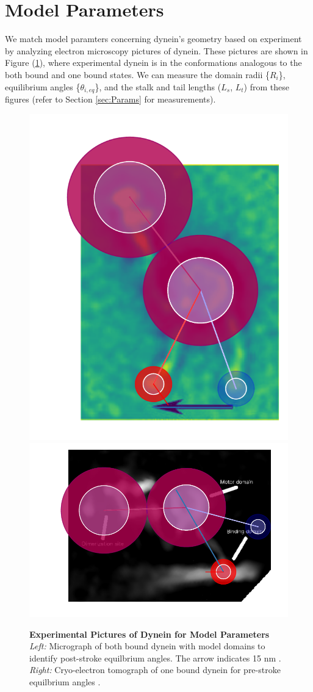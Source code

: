 \section{Model Parameters}

We match model paramters concerning dynein's geometry based on experiment by analyzing electron microscopy pictures of dynein. These pictures are shown in Figure (\ref{fig:ParamsPics}), where experimental dynein is in the conformations analogous to the both bound and one bound states. We can measure the domain radii \{$R_i$\}, equilibrium angles \{$\theta_{i,eq}$\}, and the stalk and tail lengths ($L_s$, $L_t$) from these figures (refer to Section \ref{sec:Params} for measurements).  

\begin{figure}[hbt!]
	\centering
	\includegraphics[width=0.3\columnwidth]{../../plots/burgess-model-figure.pdf}
	\includegraphics[width=0.5\columnwidth]{../../plots/grotjahn-model-figure.pdf}%
	\caption[Experimental Pictures of Dynein for Model Parameters]{\textbf{Experimental Pictures of Dynein for Model Parameters} \textit{Left:} Micrograph of both bound dynein with model domains to identify post-stroke equilbrium angles. The arrow indicates 15 nm \cite{Burgess2003}.  \textit{Right:} Cryo-electron tomograph of one bound dynein for pre-stroke equilbrium angles \cite{grotjahn2018cryo}.} 
	\label{fig:ParamsPics}
\end{figure}

